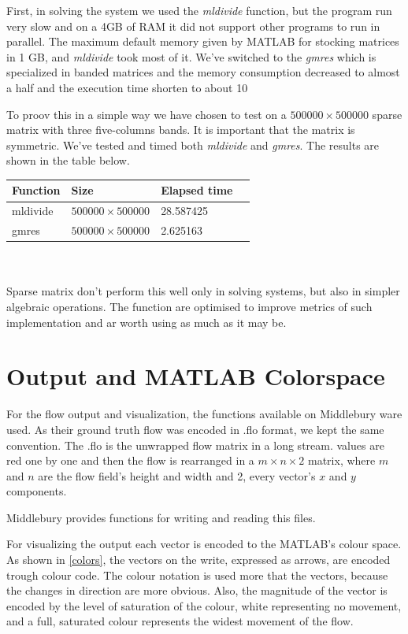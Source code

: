 \documentclass[12pt,a4paper,twoside]{report}
\begin{document}
{First, in solving the system we used the \textit{mldivide} function, but the program run very slow and on a 4GB of RAM it did not support other programs to run in parallel. The maximum default memory given by MATLAB for stocking matrices in 1 GB, and \textit{mldivide} took most of it.
We've switched to the \textit{gmres} which is specialized in banded matrices and the memory consumption decreased to almost a half and the execution time shorten to about 10%

To proov this in a simple way we have chosen to test on a  $500000 \times 500000$ sparse matrix with three five-columns bands. It is important that the matrix is symmetric. We've tested and timed both \textit{mldivide} and \textit{gmres}. The results are shown in the table below.
\\

\begin{tabular}{ l l  l l }
	\hline
	Function  &           Size  &                Elapsed time   \\
	\hline
mldivide    &    $500000\times 500000$      &      28.587425   \\
gmres  &    $500000\times 500000$       &         2.625163   
	
\end{tabular}
\\
\\

Sparse matrix don't perform this well only in solving systems, but also in simpler algebraic operations. The function are optimised to improve metrics of such implementation and ar worth using as much as it may be.

\section{Output and MATLAB Colorspace}


For the flow output and visualization, the functions available on Middlebury ware used.
As their ground truth flow was encoded in .flo format, we kept the same convention. The .flo is the unwrapped flow matrix in a long stream. values are red one by one and then the flow is rearranged in a $m\times n \times 2$ matrix, where $m$ and $n$ are the flow field's height and width and 2, every vector's $x$ and $y$ components.

Middlebury\cite{middleburry} provides functions for writing and reading this files. 

For visualizing the output each vector is encoded to the MATLAB's colour space. As shown in \ref{colors}, the vectors on the write, expressed as arrows, are encoded trough colour code. The colour notation is  used more that the vectors, because the changes in direction are more obvious. Also, the magnitude of the vector is encoded by the level of saturation of the colour, white representing no movement, and a full, saturated colour represents the widest movement of the flow.

}
\end{document}
